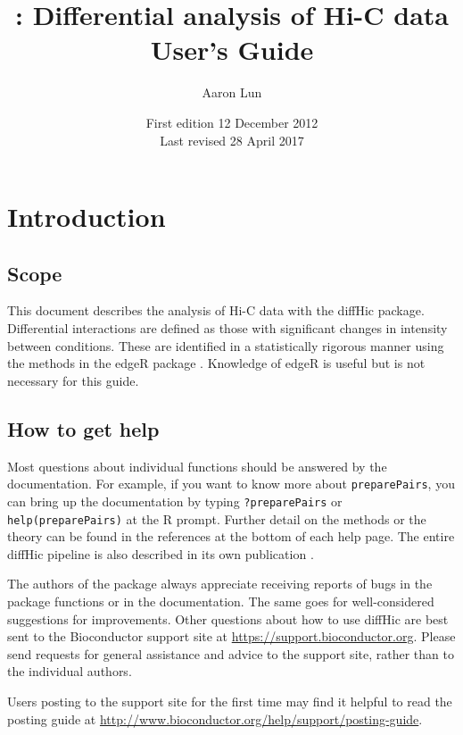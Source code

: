 \documentclass[12pt]{report}
\title{\pkgname{}: Differential analysis of Hi-C data \\ \vspace{0.2in} User's Guide}
\author{Aaron Lun}
\date{First edition 12 December 2012\\
\vspace{6pt}
Last revised 28 April 2017}
\newcommand{\edgeR}{edgeR}
\newcommand{\pkgname}{diffHic}
\newcommand{\code}[1]{{\small\texttt{#1}}}
\newcommand{\R}{\textsf{R}}
\begin{document}
\maketitle
\tableofcontents


\newpage

\chapter{Introduction}
\section{Scope}
This document describes the analysis of Hi-C data with the \pkgname{} package.
Differential interactions are defined as those with significant changes in intensity between conditions.
These are identified in a statistically rigorous manner using the methods in the \edgeR{} package \citep{edgeR}.
Knowledge of \edgeR{} is useful but is not necessary for this guide.

\section{How to get help}
Most questions about individual functions should be answered by the documentation.
For example, if you want to know more about \code{preparePairs}, you can bring up the documentation by typing \code{?preparePairs} or \code{help(preparePairs)} at the \R{} prompt.
Further detail on the methods or the theory can be found in the references at the bottom of each help page.
The entire \pkgname{} pipeline is also described in its own publication \citep{lun2015diffhic}.

The authors of the package always appreciate receiving reports of bugs in the package functions or in the documentation. 
The same goes for well-considered suggestions for improvements. 
Other questions about how to use \pkgname{} are best sent to the Bioconductor support site at \url{https://support.bioconductor.org}.
Please send requests for general assistance and advice to the support site, rather than to the individual authors. 

Users posting to the support site for the first time may find it helpful to read the posting guide at \url{http://www.bioconductor.org/help/support/posting-guide}.
\end{document}
